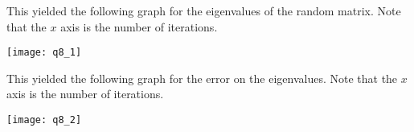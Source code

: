 \documentclass{article}
\begin{document}
This yielded the following graph for the eigenvalues of the random matrix.
Note that the $x$ axis is the number of iterations.

\texttt{[image: q8\_1]}

This yielded the following graph for the error on the eigenvalues.
Note that the $x$ axis is the number of iterations.

\texttt{[image: q8\_2]}
\end{document}

